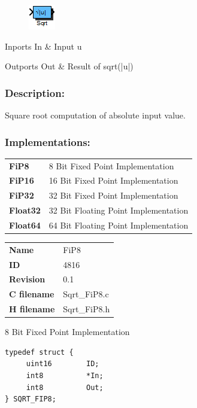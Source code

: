\label{block:Sqrt}
\begin{figure}[H]\includegraphics{Sqrt}\end{figure} 

\begin{XtoCtabular}{Inports}
In & Input u\tabularnewline
\hline
\end{XtoCtabular}


\begin{XtoCtabular}{Outports}
Out & Result of sqrt(|u|)\tabularnewline
\hline
\end{XtoCtabular}

\subsubsection*{Description:}
Square root computation of absolute input value.


\subsubsection*{Implementations:}
\begin{tabular}{l l}
\textbf{FiP8} & 8 Bit Fixed Point Implementation\tabularnewline
\textbf{FiP16} & 16 Bit Fixed Point Implementation\tabularnewline
\textbf{FiP32} & 32 Bit Fixed Point Implementation\tabularnewline
\textbf{Float32} & 32 Bit Floating Point Implementation\tabularnewline
\textbf{Float64} & 64 Bit Floating Point Implementation\tabularnewline
\end{tabular}

\nopagebreak[0]
\begin{tabular}{l l}
\textbf{Name} & FiP8 \tabularnewline
\textbf{ID} & 4816 \tabularnewline
\textbf{Revision} & 0.1 \tabularnewline
\textbf{C filename} & Sqrt\_FiP8.c \tabularnewline
\textbf{H filename} & Sqrt\_FiP8.h \tabularnewline
\end{tabular}
\vspace{1ex}

8 Bit Fixed Point Implementation

\begin{lstlisting}
typedef struct {
     uint16        ID;
     int8          *In;
     int8          Out;
} SQRT_FIP8;
\end{lstlisting}

